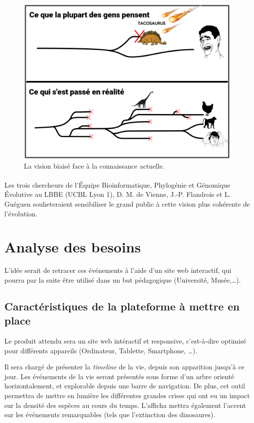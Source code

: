 \documentclass[a4paper]{article}
\begin{document}
	\begin{figure}[!h]
		\centering
		\includegraphics[width=12cm]{./img/illustr1.png}
		\caption{La vision biaisé face à la connaissance actuelle.}
		\label{comic1}
	\end{figure}

	\paragraph{}
	Les trois chercheurs de l'Équipe Bioinformatique, Phylogénie et Génomique Évolutive au LBBE (UCBL Lyon 1), D. M. de Vienne, J.-P. Flandrois et L. Guéguen souheteraient sensibiliser le grand public à cette vision plus cohérente de l'évolution. 

\section{Analyse des besoins}

	L'idée serait de retracer ces événements à l'aide d'un site web interactif, qui pourra par la suite être utilisé dans un but pédagogique (Université, Musée,\ldots).

	\subsection{Caractéristiques de la plateforme à mettre en place}
		Le produit attendu sera un site web intéractif et responsive, c'est-à-dire optimisé pour différents appareils (Ordinateur, Tablette, Smartphone, \ldots).
		

		Il sera chargé de présenter la \emph{timeline} de la vie, depuis son apparition jusqu'à ce jour. Les événements de la vie seront présentés sous forme d'un arbre orienté horizontalement, et explorable depuis une barre de navigation.	De plus, cet outil permettra de mettre en lumière les différentes grandes crises qui ont eu un impact sur la densité des espèces au cours du temps. L'afficha mettra également l'accent sur les événements remarquables (tels que l'extinction des dinosaures). 
\end{document}
